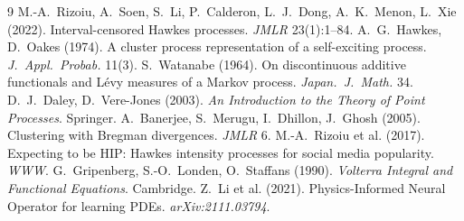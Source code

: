 \documentclass[11pt]{article}
\theoremstyle{plain}
\theoremstyle{definition}
\theoremstyle{remark}
\begin{document}
\begin{thebibliography}{9}
\small
{} M.-A.~Rizoiu, A.~Soen, S.~Li, P.~Calderon, L.~J.~Dong,
A.~K.~Menon, L.~Xie (2022). Interval-censored Hawkes processes. \emph{JMLR}
23(1):1--84.
 A.~G.~Hawkes, D.~Oakes (1974). A cluster process
representation of a self-exciting process. \emph{J.~Appl.~Probab.} 11(3).
 S.~Watanabe (1964). On discontinuous additive functionals and
L\'evy measures of a Markov process. \emph{Japan.~J.~Math.} 34.
 D.~J.~Daley, D.~Vere-Jones (2003). \emph{An Introduction to
the Theory of Point Processes}. Springer.
 A.~Banerjee, S.~Merugu, I.~Dhillon, J.~Ghosh (2005).
Clustering with Bregman divergences. \emph{JMLR} 6.
 M.-A.~Rizoiu et al. (2017). Expecting to be HIP: Hawkes
intensity processes for social media popularity. \emph{WWW}.
 G.~Gripenberg, S.-O.~Londen, O.~Staffans (1990). \emph{Volterra
Integral and Functional Equations}. Cambridge.
 Z.~Li et al. (2021). Physics-Informed Neural Operator for
learning PDEs. \emph{arXiv:2111.03794}.
\end{thebibliography}
\end{document}
